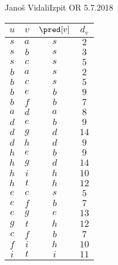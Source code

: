 \begin{naloga}{Janoš Vidali}{Izpit OR 5.7.2018}
\begin{odgovor}
\begin{enumerate}[(a)]
\begin{tabela}
\begin{tabular}{cc|cc}
$u$ & $v$ & $\pred[v]$ & $d_v$ \\ \hline
$ s$ & $a$ & $s$ & $2$ \\
$ s$ & $b$ & $s$ & $3$ \\
$ s$ & $c$ & $s$ & $5$ \\
$ b$ & $a$ & $s$ & $2$ \\
$ b$ & $c$ & $s$ & $5$ \\
$ b$ & $e$ & $b$ & $9$ \\
$ b$ & $f$ & $b$ & $7$ \\
$ a$ & $d$ & $a$ & $8$ \\
$ d$ & $e$ & $b$ & $9$ \\
$ d$ & $g$ & $d$ & $14$ \\
$ d$ & $h$ & $d$ & $9$ \\
$ h$ & $e$ & $b$ & $9$ \\
$ h$ & $g$ & $d$ & $14$ \\
$ h$ & $i$ & $h$ & $10$ \\
$ h$ & $t$ & $h$ & $12$ \\
$ e$ & $c$ & $s$ & $5$ \\
$ e$ & $f$ & $b$ & $7$ \\
$ e$ & $g$ & $e$ & $13$ \\
$ g$ & $t$ & $h$ & $12$ \\
$ c$ & $f$ & $b$ & $7$ \\
$ f$ & $i$ & $h$ & $10$ \\
$ i$ & $t$ & $i$ & $11$ \\
\end{tabular}
\end{tabela}


\end{enumerate}
\end{odgovor}
\end{naloga}
